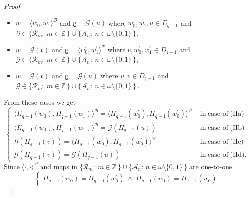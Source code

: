 \documentclass[10pt,a4paper, openany,  oldfontcommands]{memoir}
\newtheorem{open problem} [theorem] {Open Problem}
\newtheorem{open question} [theorem] {Open Question}
\begin{document}
\begin{proof}
\begin{itemize}
 
\item[(IIb)]    $  w  =  \langle  w_0,  w_1  \rangle^{  \mathcal{B}  }  $   and 
 $  \mathsf{g}    =  \mathcal{G}  \left( u \right)    $
 where  $ w_0, w_1,   u   \in    D_{q-1}  $
 and    $    \mathcal{G}   \in   \lbrace  \mathcal{R}_m   :  \   m  \in  \mathbb{Z} \,   \rbrace   \cup 
 \lbrace  \mathcal{A}_n :  \   n  \in    \omega  \setminus \lbrace 0, 1   \rbrace  \,   \rbrace       $; 
 
 
 
\item[(IIc)]   $  w  =  \mathcal{G} \left( v  \right)   $  and     $  \mathsf{g}  =  \langle   w^{  \prime  }_0,     w^{  \prime  }_1  \rangle^{  \mathcal{B}  }  $
 where  $v ,   w^{  \prime  }_0,   w^{  \prime  }_1  \in D_{q-1}$  and    $    \mathcal{G}   \in   \lbrace  \mathcal{R}_m   :  \   m  \in  \mathbb{Z} \,   \rbrace   \cup 
 \lbrace  \mathcal{A}_n :  \   n  \in    \omega  \setminus \lbrace 0, 1   \rbrace  \,   \rbrace       $; 
 
 
 
 
 
 
  
\item[(IId)]  $  w  =  \mathcal{G} \left( v  \right)   $  and     $\mathsf{g}    =  \mathcal{G} \left( u  \right)     $
 where  $ u,  v   \in D_{q-1} $  and    $    \mathcal{G}   \in   \lbrace  \mathcal{R}_m   :  \   m  \in  \mathbb{Z} \,   \rbrace   \cup 
 \lbrace  \mathcal{A}_n :  \   n  \in    \omega  \setminus \lbrace 0, 1   \rbrace  \,   \rbrace         \,    $.
 \end{itemize}
  From these cases we get 
\[
 \begin{cases}
 \langle  H_{q-1} (w_0) ,  H_{q-1} (w_1)   \rangle^{  \mathcal{B}  } 
 = 
 \langle  H_{q-1}   \left( w^{ \prime }_0 \right)  , H_{q-1}   \left( w^{ \prime }_0 \right)   \rangle^{  \mathcal{B}  } 
 &      \mbox{ in case of (IIa)}
\\
 \langle  H_{q-1} (w_0) ,  H_{q-1} (w_1)   \rangle^{  \mathcal{B}  }    =  \mathcal{G}  \left(  H_{q-1}   (u)  \right)  
  &      \mbox{ in case of (IIb)}
\\
   \mathcal{G}  \left(    H_{q-1}   (v)   \right)    = 
 \langle  H_{q-1}   \left( w^{ \prime }_0 \right)  , H_{q-1}   \left( w^{ \prime }_0 \right)   \rangle^{  \mathcal{B}  } 
 &      \mbox{ in case of (IIc)} 
 \\
  \mathcal{G}  \left(  H_{q-1}   (v)  \right)    =   \mathcal{G}  \left(    H_{q-1}   (u)  \right)     &   \mbox{ in case of  (IId).}
\end{cases}
\]
 Since  $  \langle  \cdot ,  \cdot  \rangle^{  \mathcal{B} }   $ and maps    in    $   \lbrace  \mathcal{R}_m   :  \   m  \in  \mathbb{Z} \,   \rbrace   \cup 
 \lbrace  \mathcal{A}_n :  \   n  \in    \omega  \setminus \lbrace 0, 1   \rbrace  \,   \rbrace       $ 
 are one-to-one
  \[
 \begin{cases}
  H_{q-1} (w_0)  =   H_{q-1}   \left( w^{ \prime }_0 \right)   \;  \wedge  \;     H_{q-1} (w_1)   =  H_{q-1}   \left( w^{ \prime }_0 \right)


\end{cases}\]
\end{proof}
\end{document}
